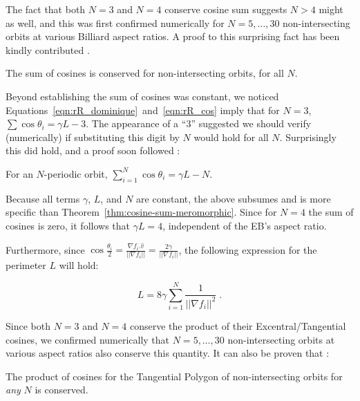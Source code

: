 The fact that both $N=3$ and $N=4$ conserve cosine sum suggests $N>4$ might as well, and this was first confirmed numerically for $N=5,\ldots,30$ non-intersecting orbits at various Billiard aspect ratios. A proof to this surprising fact has been kindly contributed \cite{sergei19_private_meromorphic}.

\begin{theorem}
The sum of cosines is conserved for non-intersecting orbits, for all $N$. %
\label{thm:cosine-sum-meromorphic}
\end{theorem}

\noindent Beyond establishing the sum of cosines was constant, we noticed Equations~\ref{eqn:rR_dominique}~and~\ref{eqn:rR_cos} imply that for $N=3$, $\sum{\cos\theta_i}=\gamma{L}-3$. The appearance of a ``$3$'' suggested we should verify (numerically) if substituting this digit by $N$ would hold for all $N$. Surprisingly this did hold, and a proof soon followed \cite{sergei19_private_cosine_sum_expression}:

\begin{theorem}
For an $N$-periodic orbit, $\sum_{i=1}^{N}{\cos\theta_i}=\gamma{L}-N$.
\label{thm:cosine-sum}
\end{theorem}

\noindent Because all terms $\gamma$, $L$, and $N$ are constant, the above subsumes and is more specific than Theorem~\ref{thm:cosine-sum-meromorphic}. Since for $N=4$ the sum of cosines is zero, it follows that $\gamma{L}=4$, independent of the EB's aspect ratio.

Furthermore, since $\cos\frac{\theta_i}{2}=\frac{\nabla{f_i}.\hat{v}}{||\nabla{f_i}||}=\frac{2\gamma}{||\nabla{f_i}||}$, the following expression for the perimeter $L$ will hold:

\begin{corollary}
\begin{equation}
    L=8\gamma\sum_{i=1}^{N}\frac{1 }{||\nabla{f_i}||^2} \;.
    \label{eqn:perimeter-new}
\end{equation}
\end{corollary}

\noindent Since both $N=3$ and $N=4$ conserve the product of their Excentral/Tangential cosines, we confirmed numerically that $N=5,\ldots,30$ non-intersecting orbits at various aspect ratios also conserve this quantity. It can also be proven that \cite{akopyan19_private_meromorphic}:

\begin{theorem}
The product of cosines for the Tangential Polygon of non-intersecting orbits for {\em any} $N$ is conserved.
\end{theorem}

